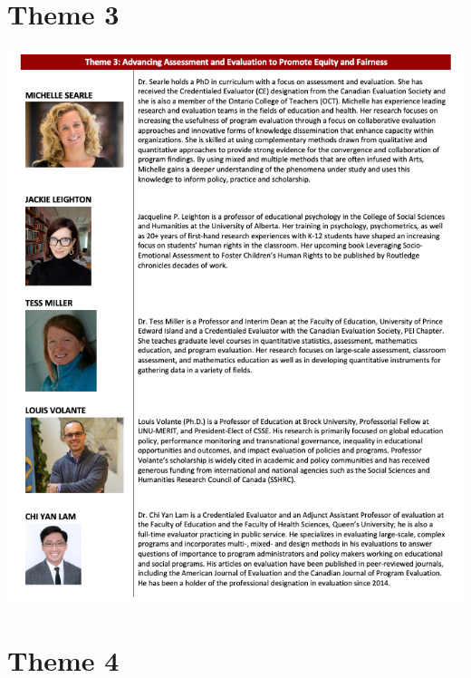 \documentclass[
]{book}
\begin{document}
\newpage

\hypertarget{theme-3}{%
\section*{Theme 3}\label{theme-3}}

\includegraphics{Content/S3.png}

\newpage

\hypertarget{theme-4}{%
\section*{Theme 4}\label{theme-4}}
\end{document}
